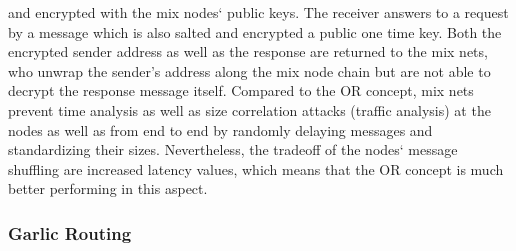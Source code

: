 \documentclass{sig-alternate}
\begin{document}
and encrypted with the mix nodes` public keys. The receiver answers to a request by a message which is also salted and encrypted a public one time key. Both the encrypted sender address as well as the response are returned to the mix nets, who unwrap the sender's address along the mix node chain but are not able to decrypt the response message itself. Compared to the OR concept, mix nets prevent time analysis as well as size correlation attacks (traffic analysis) at the nodes as well as from end to end by randomly delaying messages and standardizing their sizes. Nevertheless, the tradeoff of the nodes` message shuffling are increased latency values, which means that the OR concept is much better performing in this aspect. 

\subsubsection {Garlic Routing}
\end{document}
